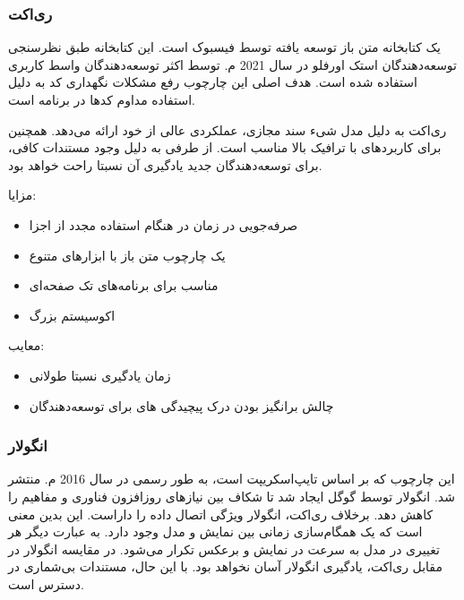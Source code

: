 \newpage


\subsubsection{ری‌اکت}

یک کتابخانه متن باز توسعه یافته توسط فیسبوک است. این کتابخانه طبق نظرسنجی توسعه‌دهندگان استک اورفلو در سال 2021 م. توسط اکثر توسعه‌دهندگان واسط کاربری استفاده شده است. هدف اصلی این چارچوب رفع مشکلات نگهداری کد به دلیل استفاده مداوم کدها در برنامه است.


ری‌اکت به دلیل مدل شیء سند مجازی، عملکردی عالی از خود ارائه می‌دهد. همچنین برای کاربردهای با ترافیک بالا مناسب است. از طرفی به دلیل وجود مستندات کافی، برای توسعه‌دهندگان جدید یادگیری آن نسبتا راحت خواهد بود.



مزایا:
\begin{itemize}
    \item صرفه‌جویی در زمان در هنگام استفاده مجدد از اجزا
    \item یک چارچوب متن باز با ابزارهای متنوع
    \item مناسب برای برنامه‌های تک صفحه‌ای
    \item اکوسیستم بزرگ
\end{itemize}

معایب:

\begin{itemize}
    \item زمان یادگیری نسبتا طولانی
    \item چالش برانگیز بودن درک پیچیدگی های  برای توسعه‌دهندگان
\end{itemize}

\newpage

\subsubsection{انگولار}

این چارچوب که بر اساس تایپ‌اسکریپت است، به طور رسمی در سال 2016 م. منتشر شد. انگولار توسط گوگل ایجاد شد تا شکاف بین نیازهای روزافزون فناوری و مفاهیم  را کاهش دهد. برخلاف ری‌اکت، انگولار ویژگی اتصال داده را داراست. این بدین معنی است که یک همگام‌سازی زمانی بین نمایش و مدل وجود دارد. به عبارت دیگر هر تغییری در مدل به سرعت در نمایش و برعکس تکرار می‌شود. در مقایسه انگولار در مقابل ری‌اکت، یادگیری انگولار آسان نخواهد بود. با این حال، مستندات بی‌شماری در دسترس است.


